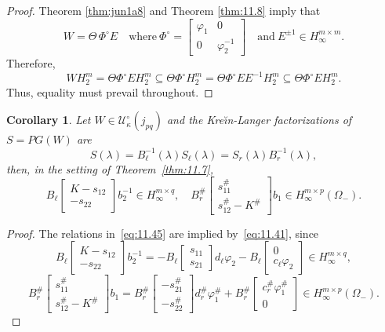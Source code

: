 \documentclass[12pt,twoside,a4paper]{amsart}
\newtheorem{corollary}[thm]{Corollary}
\theoremstyle{definition}
\numberwithin{equation}{section}
\begin{document}
\begin{proof}
 Theorem \ref{thm:jun1a8} and Theorem \ref{thm:11.8} imply that
$$
W=\Theta \,\Phi^\circ E\quad\text{where}\ \Phi^\circ=
\begin{bmatrix}\varphi_1 & 0\\0&\varphi_2^{-1}\end{bmatrix}\quad\text{and}\
E^{\pm 1}\in H_\infty^{m\times m}.
$$
Therefore,
$$
WH_2^m=\Theta \Phi^\circ EH_2^m
\subseteq \Theta \Phi^\circ H_2^m
=\Theta \Phi^\circ EE^{-1}H_2^m\subseteq
\Theta \Phi^\circ EH_2^m.
$$
Thus, equality must prevail throughout.
\end{proof}
\begin{corollary}
\label{cor:11.10}
Let $W\in  {{\mathcal U}}_\kappa^\circ(j_{pq})$ and the Kre\u{\i}n-Langer factorizations
of $S=PG(W)$ are
\[
S({\lambda})=B_{\ell}^{-1}({\lambda})S_{\ell}({\lambda})=S_r({\lambda})B_r^{-1}({\lambda}),
\]
then, in the setting of Theorem~\ref{thm:11.7},
\begin{equation}
\label{eq:11.45}
 B_{\ell}\left[\begin{array}{cc}
  K-s_{12} \\
   -s_{22}
\end{array}  \right]b_2^{-1}\in H_{\infty}^{m\times q},\quad
B_r^\#\left[\begin{array}{c}
  s_{11}^\#  \\
  s_{12}^\#-K^\#
\end{array}  \right]b_1\in H_{\infty}^{m\times p}(\Omega_-).
\end{equation}
\end{corollary}
\begin{proof}
The relations in~\eqref{eq:11.45} are implied by~\eqref{eq:11.41}, since
\[
 B_{\ell}\left[\begin{array}{cc}
  K-s_{12} \\
   -s_{22}
\end{array}  \right]b_2^{-1}= -B_{\ell}\left[\begin{array}{cc}
  s_{11} \\
   s_{21}
\end{array}  \right]d_\ell\varphi_2 - B_{\ell}\left[\begin{array}{cc}
 0 \\
 c_\ell\varphi_2
\end{array}  \right]\in H_{\infty}^{m\times q},
\]
\[
B_r^\#\left[\begin{array}{c}
  s_{11}^\#  \\
  s_{12}^\#-K^\#
\end{array}  \right]b_1=B_r^\#\left[\begin{array}{cc}
  -s_{21}^\#  \\
  -s_{22}^\#
\end{array}  \right]d_r^\#\varphi_1^\#+
B_r^\#\left[\begin{array}{cc}
   c_r^\#\varphi_1^\# \\
  0
\end{array}  \right]\in H_{\infty}^{m\times p}(\Omega_-).
\]
\end{proof}
\end{document}
